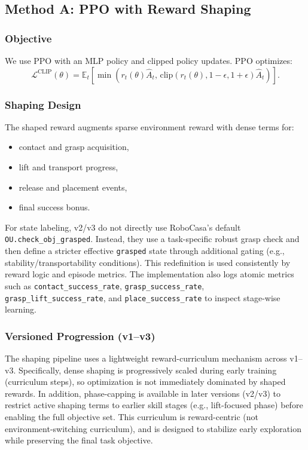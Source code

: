 \documentclass[11pt,a4paper]{article}
\begin{document}
\subsection{Method A: PPO with Reward Shaping}
\subsubsection{Objective}
We use PPO with an MLP policy and clipped policy updates. PPO optimizes:
\[
\mathcal{L}^{\text{CLIP}}(\theta) =
\mathbb{E}_t\left[
\min\left(r_t(\theta)\hat{A}_t,\,
\text{clip}(r_t(\theta), 1-\epsilon, 1+\epsilon)\hat{A}_t\right)
\right].
\]

\subsubsection{Shaping Design}
The shaped reward augments sparse environment reward with dense terms for:
\begin{itemize}
    \item contact and grasp acquisition,
    \item lift and transport progress,
    \item release and placement events,
    \item final success bonus.
\end{itemize}
For state labeling, v2/v3 do not directly use RoboCasa's default \texttt{OU.check\_obj\_grasped}. Instead, they use a task-specific robust grasp check and then define a stricter effective \texttt{grasped} state through additional gating (e.g., stability/transportability conditions). This redefinition is used consistently by reward logic and episode metrics.
The implementation also logs atomic metrics such as \texttt{contact\_success\_rate}, \texttt{grasp\_success\_rate}, \texttt{grasp\_lift\_success\_rate}, and \texttt{place\_success\_rate} to inspect stage-wise learning.

\subsubsection{Versioned Progression (v1--v3)}
The shaping pipeline uses a lightweight reward-curriculum mechanism across v1--v3. Specifically, dense shaping is progressively scaled during early training (curriculum steps), so optimization is not immediately dominated by shaped rewards. In addition, phase-capping is available in later versions (v2/v3) to restrict active shaping terms to earlier skill stages (e.g., lift-focused phase) before enabling the full objective set. This curriculum is reward-centric (not environment-switching curriculum), and is designed to stabilize early exploration while preserving the final task objective.
\end{document}
